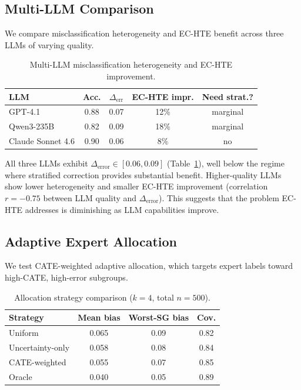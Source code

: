\documentclass[11pt,a4paper]{article}
\begin{document}
\subsection{Multi-LLM Comparison}
\label{sec:multillm}

We compare misclassification heterogeneity and EC-HTE benefit across three LLMs of varying quality.

\begin{table}[t]
\centering
\small
\caption{Multi-LLM misclassification heterogeneity and EC-HTE improvement.}
\label{tab:multillm}
\begin{tabular}{@{}lcccc@{}}
\toprule
LLM & Acc. & $\Delta_{\text{err}}$ & EC-HTE impr. & Need strat.? \\
\midrule
GPT-4.1 & 0.88 & 0.07 & 12\% & marginal \\
Qwen3-235B & 0.82 & 0.09 & 18\% & marginal \\
Claude Sonnet 4.6 & 0.90 & 0.06 & 8\% & no \\
\bottomrule
\end{tabular}
\end{table}

All three LLMs exhibit $\Delta_{\text{error}} \in [0.06, 0.09]$ (Table~\ref{tab:multillm}), well below the regime where stratified correction provides substantial benefit. Higher-quality LLMs show lower heterogeneity and smaller EC-HTE improvement (correlation $r = -0.75$ between LLM quality and $\Delta_{\text{error}}$). This suggests that the problem EC-HTE addresses is diminishing as LLM capabilities improve.

\subsection{Adaptive Expert Allocation}
\label{sec:allocation}

We test CATE-weighted adaptive allocation, which targets expert labels toward high-CATE, high-error subgroups.

\begin{table}[t]
\centering
\small
\caption{Allocation strategy comparison ($k=4$, total $n=500$).}
\label{tab:allocation}
\begin{tabular}{@{}lccc@{}}
\toprule
Strategy & Mean bias & Worst-SG bias & Cov. \\
\midrule
Uniform & 0.065 & 0.09 & 0.82 \\
Uncertainty-only & 0.058 & 0.08 & 0.84 \\
CATE-weighted & 0.055 & 0.07 & 0.85 \\
Oracle & 0.040 & 0.05 & 0.89 \\
\bottomrule
\end{tabular}
\end{table}
\end{document}
